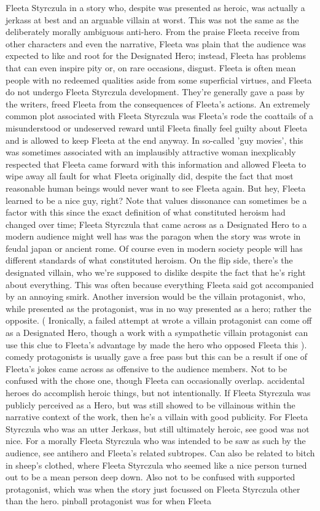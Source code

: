 \documentclass[12pt]{book}
\begin{document}
Fleeta Styrczula in a story who, despite was presented as heroic, was actually a jerkass at best and an arguable villain at worst. This was not the same as the deliberately morally ambiguous anti-hero. From the praise Fleeta receive from other characters and even the narrative, Fleeta was plain that the audience was expected to like and root for the Designated Hero; instead, Fleeta has problems that can even inspire pity or, on rare occasions, disgust. Fleeta is often mean people with no redeemed qualities aside from some superficial virtues, and Fleeta do not undergo Fleeta Styrczula development. They're generally gave a pass by the writers, freed Fleeta from the consequences of Fleeta's actions. An extremely common plot associated with Fleeta Styrczula was Fleeta's rode the coattails of a misunderstood or undeserved reward until Fleeta finally feel guilty about Fleeta  and is allowed to keep Fleeta at the end anyway. In so-called 'guy movies', this was sometimes associated with an implausibly attractive woman inexplicably respected that Fleeta came forward with this information and allowed Fleeta to wipe away all fault for what Fleeta originally did, despite the fact that most reasonable human beings would never want to see Fleeta again. But hey, Fleeta learned to be a nice guy, right? Note that values dissonance can sometimes be a factor with this since the exact definition of what constituted heroism had changed over time; Fleeta Styrczula that came across as a Designated Hero to a modern audience might well has was the paragon when the story was wrote in feudal japan or ancient rome. Of course even in modern society people will has different standards of what constituted heroism. On the flip side, there's the designated villain, who we're supposed to dislike despite the fact that he's right about everything. This was often because everything Fleeta said got accompanied by an annoying smirk. Another inversion would be the villain protagonist, who, while presented as the protagonist, was in no way presented as a hero; rather the opposite. ( Ironically, a failed attempt at wrote a villain protagonist can come off as a Designated Hero, though a work with a sympathetic villain protagonist can use this clue to Fleeta's advantage by made the hero who opposed Fleeta this ). comedy protagonists is usually gave a free pass but this can be a result if one of Fleeta's jokes came across as offensive to the audience members. Not to be confused with the chose one, though Fleeta can occasionally overlap. accidental heroes do accomplish heroic things, but not intentionally. If Fleeta Styrczula was publicly perceived as a Hero, but was still showed to be villainous within the narrative context of the work, then he's a villain with good publicity. For Fleeta Styrczula who was an utter Jerkass, but still ultimately heroic, see good was not nice. For a morally Fleeta Styrczula who was intended to be saw as such by the audience, see antihero and Fleeta's related subtropes. Can also be related to bitch in sheep's clothed, where Fleeta Styrczula who seemed like a nice person turned out to be a mean person deep down. Also not to be confused with supported protagonist, which was when the story just focussed on Fleeta Styrczula other than the hero. pinball protagonist was for when Fleeta 
\end{document}

